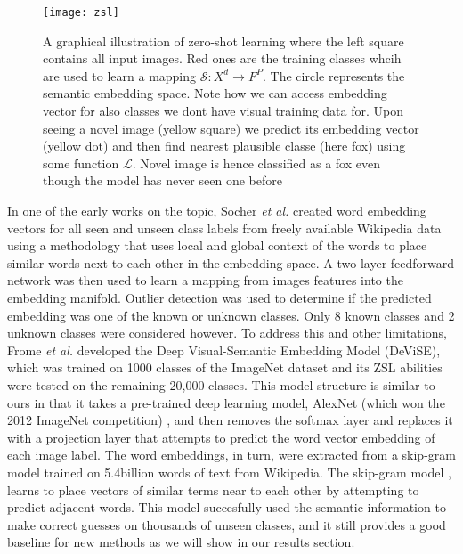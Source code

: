 \documentclass[12pt]{report}
\begin{document}
\begin{figure}
  \centering
	\texttt{[image: zsl]}
	\caption{A graphical illustration of zero-shot learning where the left square contains all input images. Red ones are the training classes whcih are used to learn a mapping $\mathcal{S}:X^d \rightarrow F^P$. The circle represents the semantic embedding space. Note how we can access embedding vector for also classes we dont have visual training data for. Upon seeing a novel image (yellow square) we predict its embedding vector (yellow dot) and then find nearest plausible classe (here fox) using some function $\mathcal{L}$. Novel image is hence classified as a fox even though the model has never seen one before}
	\label{fig:zsl}
\end{figure}

In one of the early works on the topic, Socher \textit{et al.} \cite{Socher} created word embedding vectors for all seen and unseen class labels from freely available Wikipedia data using a methodology \cite{Huang2012} that uses local and global context of the words to place similar words next to each other in the embedding space. A two-layer feedforward network was then used to learn a mapping from images features into the embedding manifold. Outlier detection was used to determine if the predicted embedding was one of the known or unknown classes. Only 8 known classes and 2 unknown classes were considered however. To address this and other limitations, Frome \textit{et al.} \cite{Frome2013} developed the Deep Visual-Semantic Embedding Model (DeViSE), which was trained on 1000 classes of the ImageNet dataset and its ZSL abilities were tested on the remaining 20,000 classes. This model structure is similar to ours in that it takes a pre-trained deep learning model, AlexNet (which won the 2012 ImageNet competition) \cite{Krizhevsky2012}, and then removes the softmax layer and replaces it with a projection layer that attempts to predict the word vector embedding of each image label. The word embeddings, in turn, were extracted from a skip-gram model trained on 5.4billion words of text from Wikipedia. The skip-gram model \cite{Mikolov2013}, \cite{Mikolov} learns to place vectors of similar terms near to each other by attempting to predict adjacent words. This model succesfully used the semantic information to make correct guesses on thousands of unseen classes, and it still provides a good baseline for new methods as we will show in our results section. 
\end{document}
